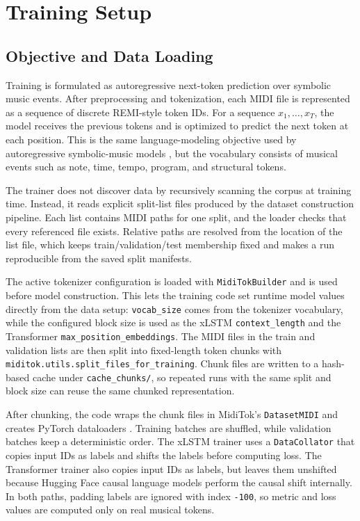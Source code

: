 \section{Training Setup}

\subsection{Objective and Data Loading}

Training is formulated as autoregressive next-token prediction over symbolic music events. After preprocessing and tokenization, each MIDI file is represented as a sequence of discrete REMI-style token IDs. For a sequence \(x_1, \ldots, x_T\), the model receives the previous tokens and is optimized to predict the next token at each position. This is the same language-modeling objective used by autoregressive symbolic-music models \citep{huangPopMusicTransformer2020,hsiaoCompoundWordTransformer2021}, but the vocabulary consists of musical events such as note, time, tempo, program, and structural tokens.

The trainer does not discover data by recursively scanning the corpus at training time. Instead, it reads explicit split-list files produced by the dataset construction pipeline. Each list contains MIDI paths for one split, and the loader checks that every referenced file exists. Relative paths are resolved from the location of the list file, which keeps train/validation/test membership fixed and makes a run reproducible from the saved split manifests.

The active tokenizer configuration is loaded with \verb|MidiTokBuilder| and is used before model construction. This lets the training code set runtime model values directly from the data setup: \verb|vocab_size| comes from the tokenizer vocabulary, while the configured block size is used as the xLSTM \verb|context_length| and the Transformer \verb|max_position_embeddings|. The MIDI files in the train and validation lists are then split into fixed-length token chunks with \verb|miditok.utils.split_files_for_training|. Chunk files are written to a hash-based cache under \verb|cache_chunks/|, so repeated runs with the same split and block size can reuse the same chunked representation.

After chunking, the code wraps the chunk files in MidiTok's \verb|DatasetMIDI| and creates PyTorch dataloaders \citep{paszkeAutomaticDifferentiationPyTorch2017}. Training batches are shuffled, while validation batches keep a deterministic order. The xLSTM trainer uses a \verb|DataCollator| that copies input IDs as labels and shifts the labels before computing loss. The Transformer trainer also copies input IDs as labels, but leaves them unshifted because Hugging Face causal language models perform the causal shift internally. In both paths, padding labels are ignored with index \verb|-100|, so metric and loss values are computed only on real musical tokens.

